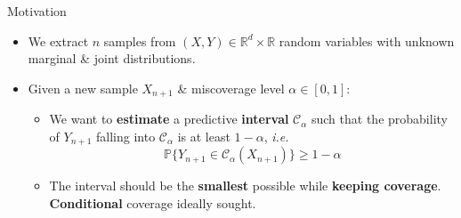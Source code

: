 \documentclass{beamer}
\newcommand{\R}{\mathbb{R}}
\renewcommand{\P}{\mathbb{P}}
\newcommand{\Ca}{\mathcal{C}_{\alpha}}
\renewcommand{\a}{\alpha}
\begin{document}
\begin{frame}{Motivation}
    \begin{itemize}%
        \item We extract $n$ samples from $(X, Y)\in \R^d\times\R$ random variables with unknown marginal \& joint distributions.
        \item Given a new sample $X_{n+1}$ \& miscoverage level $\a\in\left[ 0, 1\right]$: 
        \begin{itemize}%
            \item We want to \textbf{estimate} a predictive \textbf{interval} $\Ca$ such that the probability of $Y_{n+1}$ falling into $\Ca$ is at least $1-\a$, \textit{i.e.}
            \begin{equation*}
                \P \{ Y_{n+1} \in \Ca\left(X_{n+1}\right) \} \geq 1 - \a
            \end{equation*}
            \item The interval should be the \textbf{smallest} possible while \textbf{keeping coverage}. \textbf{Conditional} coverage ideally sought.
        \end{itemize} 
    

\end{itemize}
\end{frame}
\end{document}
